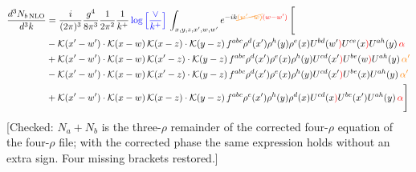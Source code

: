 \documentclass[9pt]{article}
\numberwithin{equation}{section}
\begin{document}
\begin{align}
      \frac{d^{3}N_{b\,\rm NLO}}{d^{3}k} & = \frac{i}{(2\pi)^{3}}\frac{g^{4}}{8\pi^{3}}\frac{1}{2\pi^{2}} \frac{1}{k^{+}}\,{\color{blue}\log{\left[\frac{\vee}{k^{+}}\right]}}\,\int_{x,y,z,x^{\prime},w,w^{\prime}}e^{-ik{\color{orange}\cancel{(w^{\prime}-w)}}{\color{red}(w-w^{\prime})}}\, \Bigg[\notag \\ & - \mathcal{K}(x'-w')\cdot \mathcal{K}(x-w)\, \mathcal{K}(x-z)\cdot \mathcal{K}(y-z)\, f^{a b c} \rho^{d}(x') \rho^{h}(y) \rho^{e}(x) U^{bd}(w'{\color{red})} U^{ce}(x{\color{red})} U^{a h}(y)\,{\color{red}\alpha} \nonumber\\
    &+ \mathcal{K}(x'-w')\cdot \mathcal{K}(x-w)\,\mathcal{K}(x'-z)\cdot \mathcal{K}(y-z)\, f^{a b c} \rho^{d}(x') \rho^{e}(x) \rho^{h}(y) U^{cd}(x'{\color{red})} U^{be}(w{\color{red})} U^{a h}(y)\, {\color{orange} \alpha'}\nonumber\\
    &- \mathcal{K}(x'-w')\cdot \mathcal{K}(x-w)\,\mathcal{K}(x'-z)\cdot \mathcal{K}(y-z)\, f^{a b c} \rho^{d}(x') \rho^{e}(x) \rho^{h}(y) U^{cd}(x'{\color{red})} U^{b e}(x) U^{a h}(y)\, {\color{orange} \alpha'}\nonumber\\
    &+  \mathcal{K}(x'-w')\cdot \mathcal{K}(x-w)\, \mathcal{K}(x-z)\cdot \mathcal{K}(y-z)\, f^{a b c} \rho^{e}(x') \rho^{h}(y) \rho^{d}(x) U^{cd}(x{\color{red})} U^{b e}(x') U^{a h}(y)\, {\color{red}\alpha}\Bigg]
\end{align} {\color{red}[Checked: $N_{a}+N_{b}$ is the three-$\rho$ remainder of the corrected four-$\rho$ equation of the four-$\rho$ file; with the corrected phase the same expression holds without an extra sign. Four missing brackets restored.]}\par\noindent 
\end{document}
